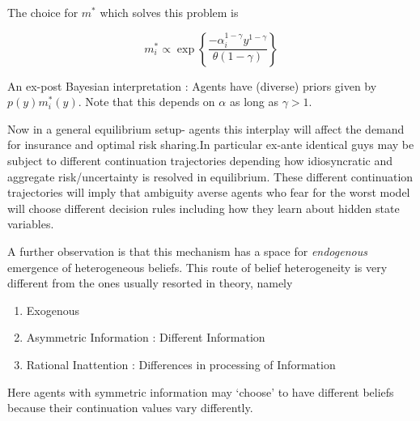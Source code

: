 \documentclass[12pt]{article}
\begin{document}
\noindent  The choice for $m^*$ which solves this problem is

\[m_i^*\propto \exp\left\{\frac {-\alpha^{1-\gamma}_iy^{1-\gamma}}{\theta(1-\gamma)}\right\}\]

\noindent An ex-post Bayesian interpretation : Agents have (diverse) priors given by $p(y)m^*_i(y)$. Note that this depends on $\alpha$ as long as $\gamma>1$.

\vspace{10 mm}

\noindent Now in a general equilibrium setup- agents this interplay will affect the demand for insurance and optimal risk sharing.In particular ex-ante identical guys may be subject to different continuation trajectories depending how idiosyncratic and aggregate risk/uncertainty is resolved in equilibrium. These different continuation trajectories will imply that ambiguity averse agents who fear for the worst model will choose different decision rules including how they learn about hidden state variables.

\vspace{10 mm}
\noindent  A further observation is that this mechanism has a space for \emph{endogenous} emergence of heterogeneous beliefs. This route of belief heterogeneity is very different from the ones usually resorted in theory, namely
\begin{enumerate}
	\item Exogenous 
	\item Asymmetric Information : Different Information  
	\item Rational Inattention  : Differences in processing of Information
\end{enumerate}

\noindent Here agents with symmetric information may `choose' to have different beliefs because their continuation values vary differently. 
\end{document}
